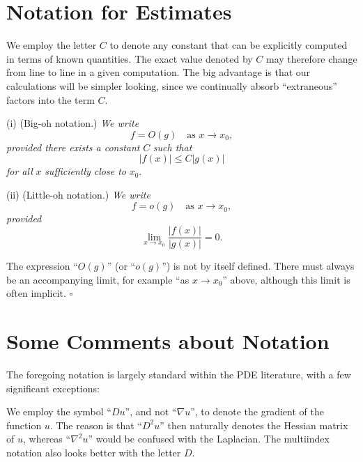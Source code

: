 \section{Notation for Estimates}
\label{sec:notation-for-estimates}

\begin{remark}[Constants]
\label{rem:constant-notation-convention}
We employ the letter $C$ to denote any constant that can be explicitly computed in terms of known quantities. The exact value denoted by $C$ may therefore change from line to line in a given computation. The big advantage is that our calculations will be simpler looking, since we continually absorb ``extraneous'' factors into the term $C$.
\end{remark}

\begin{definition}
\label{def:big-oh-little-oh-notation}
(i) (Big-oh notation.) \textit{We write}
$$f = O(g) \quad \text{as } x \to x_0,$$
\textit{provided there exists a constant } $C$ \textit{ such that}
$$|f(x)| \leq C|g(x)|$$
\textit{for all } $x$ \textit{ sufficiently close to } $x_0$.

(ii) (Little-oh notation.) \textit{We write}
$$f = o(g) \quad \text{as } x \to x_0,$$
\textit{provided}
$$\lim_{x \to x_0} \frac{|f(x)|}{|g(x)|} = 0.$$
\end{definition}

\begin{remark}
\label{rem:big-oh-little-oh-implicit-limit}
The expression ``$O(g)$'' (or ``$o(g)$'') is not by itself defined. There must always be an accompanying limit, for example ``as $x \to x_0$'' above, although this limit is often implicit. $\square$
\end{remark}

\section{Some Comments about Notation}
\label{sec:comments-about-notation}

The foregoing notation is largely standard within the PDE literature, with a few significant exceptions:

\begin{remark}
\label{rem:gradient-notation-choice-du}
We employ the symbol ``$Du$'', and not ``$\nabla u$'', to denote the gradient of the function $u$. The reason is that ``$D^2u$'' then naturally denotes the Hessian matrix of $u$, whereas ``$\nabla^2 u$'' would be confused with the Laplacian. The multiindex notation also looks better with the letter $D$.
\end{remark}

